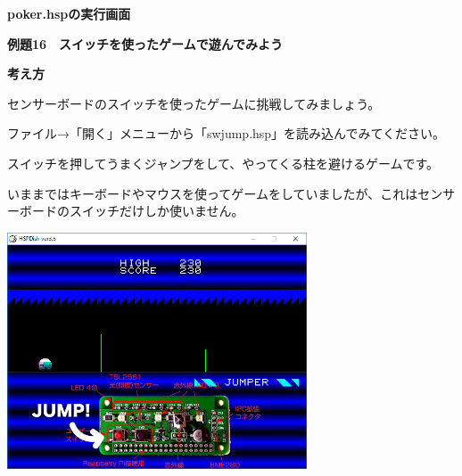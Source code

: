 \documentclass[a4paper,dvipdfmx]{jarticle}
\newcommand\textstyleqwerty[1]{#1}
\begin{document}
\bigskip


\bigskip


\bigskip


\bigskip


\bigskip


\bigskip


\bigskip


\bigskip


\bigskip


\bigskip


\bigskip


\bigskip


\bigskip


\bigskip

\textstyleqwerty{\textbf{poker.hspの実行画面}}


\bigskip


\bigskip


\bigskip


\bigskip

\clearpage
\textstyleqwerty{\textbf{例題16　スイッチを使ったゲームで遊んでみよう}}


\bigskip

{\bfseries
考え方}


\bigskip

センサーボードのスイッチを使ったゲームに挑戦してみましょう。

ファイル→「開く」メニューから「swjump.hsp」を読み込んでみてください。

スイッチを押してうまくジャンプをして、やってくる柱を避けるゲームです。

いままではキーボードやマウスを使ってゲームをしていましたが、これはセンサーボードのスイッチだけしか使いません。


\bigskip



\begin{center}
\includegraphics[width=8.881cm,height=7.011cm]{text02-img/text02-img054.png}

\end{center}
\end{document}
